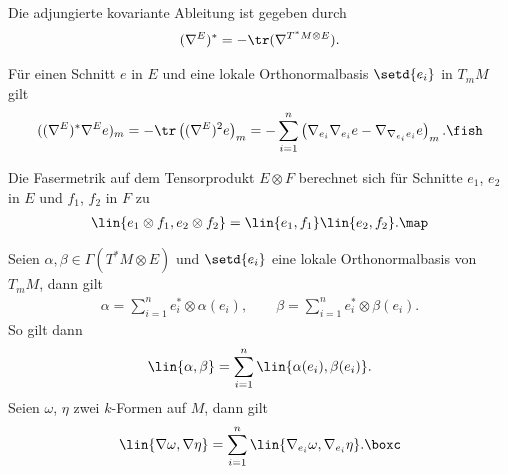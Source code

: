 \documentclass[%
	paper=a5,%
	fleqn,%
	DIV=18,%
	BCOR=0mm,
	fontsize=11pt,
	titlepage=false,%
	bibliography=totoc,
	DIV=18,%
	twoside=true,
	pdftitle=Riemannsche Geometrie,
	pdfauthor=Uwe Semmelmann,
	numbers=noendperiod]%
	{scrbook}
\begin{document}
\begin{lem}
\begin{propenum}
\item Die adjungierte kovariante Ableitung ist gegeben durch
\begin{align*}
(\nabla^E)^* = -\tr(\nabla^{T^*M\otimes E}).
\end{align*}
\item Für einen Schnitt $e$ in $E$ und eine lokale Orthonormalbasis $\setd{e_{i}}$ in $T_{m}M$ gilt
\begin{align*}
((\nabla^E)^*\nabla^E e)_{m} = -\tr\left((\nabla^E)^2e\right)_{m} = 
-\sum_{i=1}^n \left(\nabla_{e_{i}}\nabla_{e_{i}}e - \nabla_{\nabla_{e_{i}}e_{i}}e \right)_{m}.\fish
\end{align*}
\end{propenum}
\end{lem}

\begin{rem}
Die Fasermetrik auf dem Tensorprodukt $E\otimes F$ berechnet sich für Schnitte $e_{1}$, $e_{2}$ in $E$ und $f_{1}$, $f_{2}$ in $F$ zu
\begin{align*}
\lin{e_{1}\otimes f_{1},e_{2}\otimes f_{2}} = \lin{e_{1},f_{1}}\lin{e_{2},f_{2}}.\map
\end{align*}
\end{rem}

\begin{ex}
Seien $\alpha,\beta\in\Gamma(T^*M\otimes E)$ und $\setd{e_{i}}$ eine lokale Orthonormalbasis von $T_{m}M$, dann gilt
\begin{align*}
\alpha = \sum_{i=1}^n e_{i}^* \otimes \alpha(e_{i}),\qquad
\beta = \sum_{i=1}^n e_{i}^* \otimes \beta(e_{i}).
\end{align*}
So gilt dann
\begin{align*}
\lin{\alpha,\beta} = \sum_{i=1}^n \lin{\alpha(e_{i}),\beta(e_{i})}.
\end{align*}
Seien $\omega$, $\eta$ zwei $k$-Formen auf $M$, dann gilt
\begin{align*}
\lin{\nabla \omega, \nabla \eta} = \sum_{i=1}^n \lin{\nabla_{e_{i}}\omega, \nabla_{e_{i}}\eta}.\boxc
\end{align*}
\end{ex}
\end{document}
